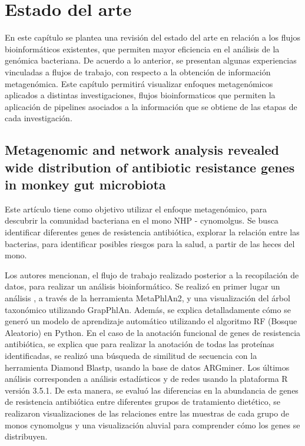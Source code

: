\documentclass[12pt]{article}
\begin{document}
\newpage
\section{Estado del arte}
En este  capítulo se plantea una revisión del estado del arte en relación a los flujos bioinformáticos existentes, que permiten mayor eficiencia en el análisis de la genómica bacteriana.
De acuerdo a lo anterior, se presentan algunas experiencias vinculadas a flujos de trabajo, con respecto  a la obtención de información metagenómica.
Este capítulo permitirá visualizar enfoques metagenómicos aplicados a distintas investigaciones, flujos bioinformaticos que permiten la aplicación de pipelines asociados a  la información que se obtiene de las etapas de cada investigación.

\subsection*{Metagenomic and network analysis revealed wide distribution of antibiotic resistance genes in monkey gut microbiota}
Este artículo tiene como objetivo utilizar el enfoque metagenómico, para descubrir la comunidad bacteriana en el mono NHP - cynomolgus. Se busca identificar diferentes genes de resistencia antibiótica, explorar la relación entre las bacterias, para identificar posibles riesgos para la salud, a partir de las heces del mono.

Los autores mencionan, el flujo de trabajo realizado posterior a la recopilación de datos, para realizar un análisis bioinformático. Se realizó en primer lugar un análisis , a través de la herramienta MetaPhlAn2, y una visualización del árbol taxonómico utilizando GrapPhlAn. Además, se explica detalladamente cómo se generó un modelo de aprendizaje automático utilizando el algoritmo RF (Bosque Aleatorio) en Python.  En el caso de la anotación funcional de genes de resistencia antibiótica, se explica que para realizar la anotación de todas las proteínas identificadas, se realizó una búsqueda de similitud de secuencia con la herramienta Diamond Blastp, usando la base de datos ARGminer. Los últimos análisis corresponden a análisis estadísticos y de redes usando la plataforma R versión 3.5.1. De esta manera, se evaluó las diferencias en la abundancia de genes de resistencia antibiótica entre diferentes grupos de tratamiento dietético, se realizaron visualizaciones de las relaciones entre las muestras de cada grupo de monos cynomolgus y una visualización aluvial para comprender cómo los genes se distribuyen.
\end{document}
